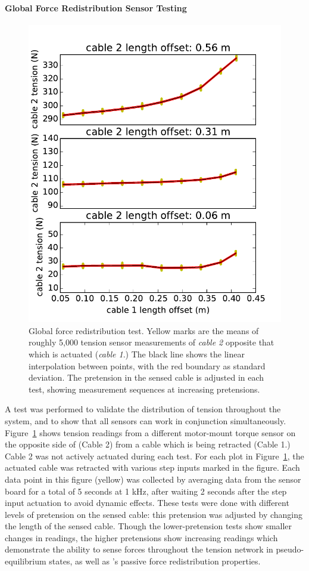 \begin{appendices}
\paragraph{Global Force Redistribution Sensor Testing}
\begin{figure}[thpb]
      \centering
      \includegraphics[width=0.55\columnwidth]{tex/img/sensor2_original}
      \caption{Global force redistribution test. Yellow marks are the means of roughly 5,000 tension sensor measurements of \emph{cable 2} opposite that which is actuated (\emph{cable 1}.) The black line shows the linear interpolation between points, with the red boundary as standard deviation. The pretension in the sensed cable is adjusted in each test, showing measurement sequences at increasing pretensions.}
      \label{fig:sensor2data_forcedistribution}
\end{figure}

A test was performed to validate the distribution of tension throughout the system, and to show that all sensors can work in conjunction simultaneously.
Figure~\ref{fig:sensor2data_forcedistribution} shows tension readings from a different motor-mount torque sensor on the opposite side of \SB{} (Cable 2) from a cable which is being retracted (Cable 1.)
Cable 2 was not actively actuated during each test.
For each plot in Figure~\ref{fig:sensor2data_forcedistribution}, the actuated cable was retracted with various step inputs marked in the figure.
Each data point in this figure (yellow) was collected by averaging data from the sensor board for a total of 5 seconds at 1 kHz, after waiting 2 seconds after the step input actuation to avoid dynamic effects.
These tests were done with different levels of pretension on the sensed cable: this pretension was adjusted by changing the length of the sensed cable.
Though the lower-pretension tests show smaller changes in readings, the higher pretensions show increasing readings which demonstrate the ability to sense forces throughout the tension network in pseudo-equilibrium states, as well as \SB{}'s passive force redistribution properties.


\end{appendices}

